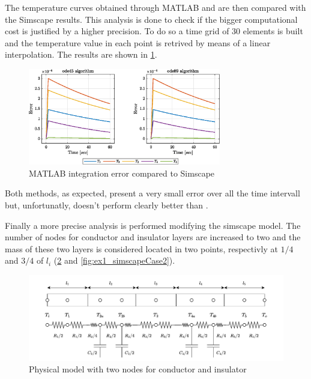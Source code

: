 \documentclass[11pt,a4paper,oneside]{article}
\begin{document}
The temperature curves obtained through MATLAB  and  are then compared with the Simscape results.
This analysis is done to check if the bigger computational cost is justified by a higher precision.
To do so a time grid of 30 elements is built and the temperature value in each point is retrived by means of a linear interpolation.
The results are shown in \cref{fig:ex1_errorCompare}.
\begin{figure}[H]
    \centering
    \includegraphics*[width=0.75\textwidth, keepaspectratio]{Figures/ex1_errorCompare.eps}
    \caption[]{\label{fig:ex1_errorCompare} MATLAB integration error compared to Simscape}
\end{figure}

Both methods, as expected, present a very small error over all the time intervall but, unfortunatly,  doesn't perform clearly better than .

Finally a more precise analysis is performed modifying the simscape model.
The number of nodes for conductor and insulator layers are increased to two and the mass of these two layers is considered located in two points, respectivly at $1/4$ and $3/4$ of $l_i$ (\cref{fig:phyModelCase2} and \cref{fig:ex1_simscapeCase2}).
\begin{figure}[H]
    \centering
    \includegraphics*[width=1\textwidth, keepaspectratio]{Figures/ex1_phyModelCase2.pdf}
    \caption[]{\label{fig:phyModelCase2} Physical model with two nodes for conductor and insulator}
\end{figure}
\end{document}
